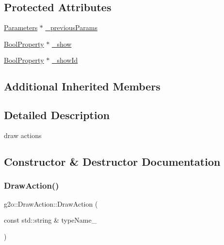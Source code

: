 \subsection*{Protected Attributes}
\begin{DoxyCompactItemize}
\item 
\mbox{\hyperlink{classg2o_1_1_draw_action_1_1_parameters}{Parameters}} $\ast$ \mbox{\hyperlink{classg2o_1_1_draw_action_af598eb77ea4e27a1c0a27533c971639d}{\+\_\+previous\+Params}}
\item 
\mbox{\hyperlink{namespaceg2o_a28e624fedcafeb2b049be2930421071f}{Bool\+Property}} $\ast$ \mbox{\hyperlink{classg2o_1_1_draw_action_a1ec3a46473daeb8ac65e6a523a9248b6}{\+\_\+show}}
\item 
\mbox{\hyperlink{namespaceg2o_a28e624fedcafeb2b049be2930421071f}{Bool\+Property}} $\ast$ \mbox{\hyperlink{classg2o_1_1_draw_action_ab5f870bf2a931e64bc994c87c4212ad3}{\+\_\+show\+Id}}
\end{DoxyCompactItemize}
\subsection*{Additional Inherited Members}


\subsection{Detailed Description}
draw actions 

\subsection{Constructor \& Destructor Documentation}
\mbox{\label{classg2o_1_1_draw_action_a6b876d6a30fa564176dc6a3caefa572e}} 
\subsubsection{\texorpdfstring{Draw\+Action()}{DrawAction()}}
{\footnotesize\ttfamily g2o\+::\+Draw\+Action\+::\+Draw\+Action (\begin{DoxyParamCaption}\item[{const std\+::string \&}]{type\+Name\+\_\+ }\end{DoxyParamCaption})}



